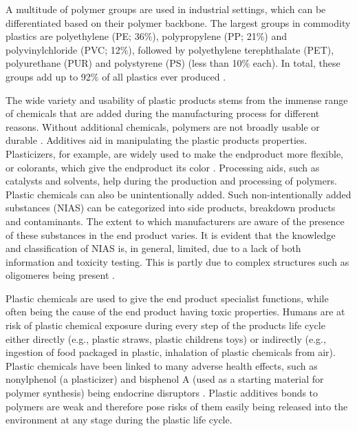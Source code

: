 \documentclass[hidelinks,11pt]{article}
\begin{document}
A multitude of polymer groups are used in industrial settings, which can be differentiated based on their 
polymer backbone. 
The largest groups in commodity plastics are polyethylene (PE; 36\%), polypropylene (PP; 21\%) and 
poly\-vinylchloride (PVC; 12\%), 
followed by polyethylene terephthalate (PET), polyurethane (PUR) and polystyrene (PS) (less than 10\% each).
In total, these groups add up to 92\% of all plastics ever produced \parencite{geyerProductionUseFate2017}.

The wide variety and usability of plastic products stems from the immense range of chemicals that are added 
during the manufacturing process for different reasons.
Without additional chemicals, polymers are not broadly usable or durable \parencite{wagnerStateSciencePlastic2025}. 
Additives aid in manipulating the plastic products properties.
Plasticizers, for example, are widely used to 
make the endproduct more flexible, or colorants, which give the endproduct its color 
\parencite{hahladakisOverviewChemicalAdditives2018a}.
Processing aids, such as catalysts and solvents, help during the production and processing of polymers.
Plastic chemicals can also be unintentionally added.
Such non-intentionally added substances (NIAS) can be categorized into side products, breakdown products and contaminants.
The extent to which manufacturers are aware of the presence of these substances in the end product varies.
It is evident that the knowledge and classification of NIAS is, in general, limited, 
due to a lack of both information and toxicity testing.
This is partly due to complex structures such as oligomeres being present 
\parencite{geuekeFPFDossierNonintentionally2018}.

Plastic chemicals are used to give the end product specialist functions, while often being the cause of the 
end product having toxic properties.
Humans are at risk of plastic chemical exposure during every step of the products life cycle either 
directly (e.g., plastic straws, plastic childrens toys) 
or indirectly (e.g., ingestion of food packaged in plastic, inhalation of plastic chemicals from air).
Plastic chemicals have been linked to many adverse health effects, such as nonylphenol (a plasticizer) 
and bisphenol A (used as a starting material for polymer synthesis) being endocrine disruptors \parencite{perez-albaladejoPlasticsPlasticAdditives2020}.
Plastic additives bonds to polymers are weak and therefore pose risks of them easily being released 
into the environment at any stage during the plastic life cycle.
\end{document}

